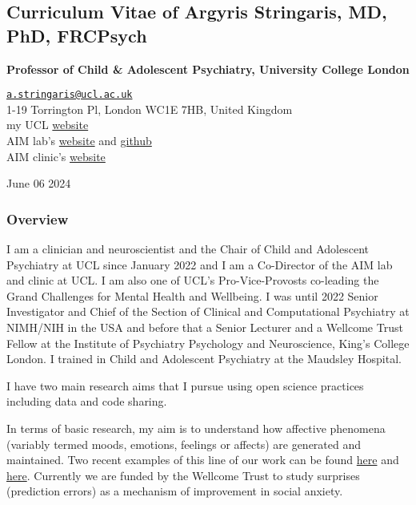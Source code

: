 \documentclass[
]{article}
\author{}
\date{\vspace{-2.5em}}
\begin{document}
\hypertarget{curriculum-vitae-of-argyris-stringaris-md-phd-frcpsych}{%
\subsection{Curriculum Vitae of Argyris Stringaris, MD, PhD,
FRCPsych}\label{curriculum-vitae-of-argyris-stringaris-md-phd-frcpsych}}

\textbf{Professor of Child \& Adolescent Psychiatry, University College
London}

\href{mailto:a.stringaris@ucl.ac.uk}{\nolinkurl{a.stringaris@ucl.ac.uk}}\\
1-19 Torrington Pl, London WC1E 7HB, United Kingdom\\
my UCL
\href{https://www.ucl.ac.uk/psychiatry/professor-argyris-stringaris}{website}\\
AIM lab's \href{https://brainlog.blog/}{website} and
\href{https://github.com/transatlantic-comppsych}{github}\\
AIM clinic's
\href{https://www.ucl.ac.uk/university-clinic/about-university-clinic/clinical-services/anxiety-self-image-and-mood-aim-clinic}{website}

June 06 2024

\hypertarget{overview}{%
\subsubsection{Overview}\label{overview}}

I am a clinician and neuroscientist and the Chair of Child and
Adolescent Psychiatry at UCL since January 2022 and I am a Co-Director
of the AIM lab and clinic at UCL. I am also one of UCL's
Pro-Vice-Provosts co-leading the Grand Challenges for Mental Health and
Wellbeing. I was until 2022 Senior Investigator and Chief of the Section
of Clinical and Computational Psychiatry at NIMH/NIH in the USA and
before that a Senior Lecturer and a Wellcome Trust Fellow at the
Institute of Psychiatry Psychology and Neuroscience, King's College
London. I trained in Child and Adolescent Psychiatry at the Maudsley
Hospital.

I have two main research aims that I pursue using open science practices
including data and code sharing.

In terms of basic research, my aim is to understand how affective
phenomena (variably termed moods, emotions, feelings or affects) are
generated and maintained. Two recent examples of this line of our work
can be found
\href{https://www.nature.com/articles/s41562-023-01519-7\#:~:text=In\%20this\%20study\%2C\%20we\%20describe,simple\%20tasks\%20or\%20rest\%20periods.}{here}
and \href{https://elifesciences.org/articles/62051}{here}. Currently we
are funded by the Wellcome Trust to study surprises (prediction errors)
as a mechanism of improvement in social anxiety.
\end{document}
